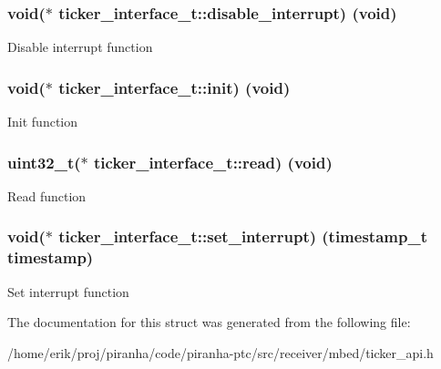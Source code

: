 \subsubsection[{\texorpdfstring{disable\+\_\+interrupt}{disable_interrupt}}]{\setlength{\rightskip}{0pt plus 5cm}void($\ast$ ticker\+\_\+interface\+\_\+t\+::disable\+\_\+interrupt) (void)}\hypertarget{structticker__interface__t_a6876eb9e303388784cd20465095c80fa}{}\label{structticker__interface__t_a6876eb9e303388784cd20465095c80fa}
Disable interrupt function 
\subsubsection[{\texorpdfstring{init}{init}}]{\setlength{\rightskip}{0pt plus 5cm}void($\ast$ ticker\+\_\+interface\+\_\+t\+::init) (void)}\hypertarget{structticker__interface__t_a35d197683ef65e14a8412dcbb5d8e83f}{}\label{structticker__interface__t_a35d197683ef65e14a8412dcbb5d8e83f}
Init function 
\subsubsection[{\texorpdfstring{read}{read}}]{\setlength{\rightskip}{0pt plus 5cm}uint32\+\_\+t($\ast$ ticker\+\_\+interface\+\_\+t\+::read) (void)}\hypertarget{structticker__interface__t_a00991371bd7d4036ae69ce70e7025a9e}{}\label{structticker__interface__t_a00991371bd7d4036ae69ce70e7025a9e}
Read function 
\subsubsection[{\texorpdfstring{set\+\_\+interrupt}{set_interrupt}}]{\setlength{\rightskip}{0pt plus 5cm}void($\ast$ ticker\+\_\+interface\+\_\+t\+::set\+\_\+interrupt) (timestamp\+\_\+t timestamp)}\hypertarget{structticker__interface__t_a3e5ddde928d414cb22206097665098fd}{}\label{structticker__interface__t_a3e5ddde928d414cb22206097665098fd}
Set interrupt function 

The documentation for this struct was generated from the following file\+:\begin{DoxyCompactItemize}
\item 
/home/erik/proj/piranha/code/piranha-\/ptc/src/receiver/mbed/ticker\+\_\+api.\+h\end{DoxyCompactItemize}
